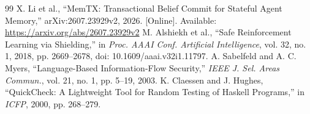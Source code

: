 \documentclass[conference]{IEEEtran}
\begin{document}
\begin{thebibliography}{99}
 X. Li et al., ``MemTX: Transactional Belief Commit for Stateful Agent Memory,'' arXiv:2607.23929v2, 2026. [Online]. Available: \url{https://arxiv.org/abs/2607.23929v2}
 M. Alshiekh et al., ``Safe Reinforcement Learning via Shielding,'' in \emph{Proc. AAAI Conf. Artificial Intelligence}, vol. 32, no. 1, 2018, pp. 2669--2678, doi: 10.1609/aaai.v32i1.11797.
 A. Sabelfeld and A. C. Myers, ``Language-Based Information-Flow Security,'' \emph{IEEE J. Sel. Areas Commun.}, vol. 21, no. 1, pp. 5--19, 2003.
 K. Claessen and J. Hughes, ``QuickCheck: A Lightweight Tool for Random Testing of Haskell Programs,'' in \emph{ICFP}, 2000, pp. 268--279.
\end{thebibliography}
\end{document}
